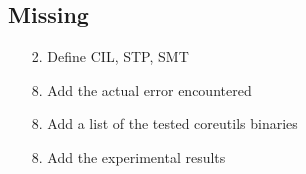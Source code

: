 \documentclass{article}
\begin{document}
\subsection{Missing}

\begin{enumerate}
	\item[2.] Define CIL, STP, SMT
	\item[8.] Add the actual error encountered
	\item[8.] Add a list of the tested coreutils binaries
	\item[8.] Add the experimental results
\end{enumerate}



\end{document}
